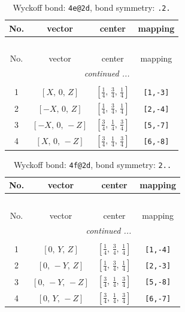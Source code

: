 \documentclass[fleqn,8pt]{jsarticle}
\begin{document}
\renewcommand{\arraystretch}{1.2}
\begin{longtable}{cccc}
\caption{Wyckoff bond: {\tt 4e@2d}, bond symmetry: {\tt .2.}}
 \\
 \hline \hline
No. & vector & center & mapping \\ \hline \endfirsthead

\multicolumn{3}{l}{\tablename\ \thetable{}} \\
 \hline \hline
No. & vector & center & mapping \\ \hline \endhead

 \hline \hline
\multicolumn{3}{r}{\footnotesize\it continued ...} \\ \endfoot

 \hline \hline
\multicolumn{3}{r}{} \\ \endlastfoot

1 & $\left[ X,\, 0,\, Z \right]$ & $\left[ \frac{1}{4},\, \frac{3}{4},\, \frac{1}{4} \right]$ & {\tt [1,-3]} \\ \hline
2 & $\left[ - X,\, 0,\, Z \right]$ & $\left[ \frac{1}{4},\, \frac{3}{4},\, \frac{1}{4} \right]$ & {\tt [2,-4]} \\ \hline
3 & $\left[ - X,\, 0,\, - Z \right]$ & $\left[ \frac{3}{4},\, \frac{1}{4},\, \frac{3}{4} \right]$ & {\tt [5,-7]} \\ \hline
4 & $\left[ X,\, 0,\, - Z \right]$ & $\left[ \frac{3}{4},\, \frac{1}{4},\, \frac{3}{4} \right]$ & {\tt [6,-8]} \\
\end{longtable}
\renewcommand{\arraystretch}{1.2}
\begin{longtable}{cccc}
\caption{Wyckoff bond: {\tt 4f@2d}, bond symmetry: {\tt 2..}}
 \\
 \hline \hline
No. & vector & center & mapping \\ \hline \endfirsthead

\multicolumn{3}{l}{\tablename\ \thetable{}} \\
 \hline \hline
No. & vector & center & mapping \\ \hline \endhead

 \hline \hline
\multicolumn{3}{r}{\footnotesize\it continued ...} \\ \endfoot

 \hline \hline
\multicolumn{3}{r}{} \\ \endlastfoot

1 & $\left[ 0,\, Y,\, Z \right]$ & $\left[ \frac{1}{4},\, \frac{3}{4},\, \frac{1}{4} \right]$ & {\tt [1,-4]} \\ \hline
2 & $\left[ 0,\, - Y,\, Z \right]$ & $\left[ \frac{1}{4},\, \frac{3}{4},\, \frac{1}{4} \right]$ & {\tt [2,-3]} \\ \hline
3 & $\left[ 0,\, - Y,\, - Z \right]$ & $\left[ \frac{3}{4},\, \frac{1}{4},\, \frac{3}{4} \right]$ & {\tt [5,-8]} \\ \hline
4 & $\left[ 0,\, Y,\, - Z \right]$ & $\left[ \frac{3}{4},\, \frac{1}{4},\, \frac{3}{4} \right]$ & {\tt [6,-7]} \\
\end{longtable}
\end{document}

